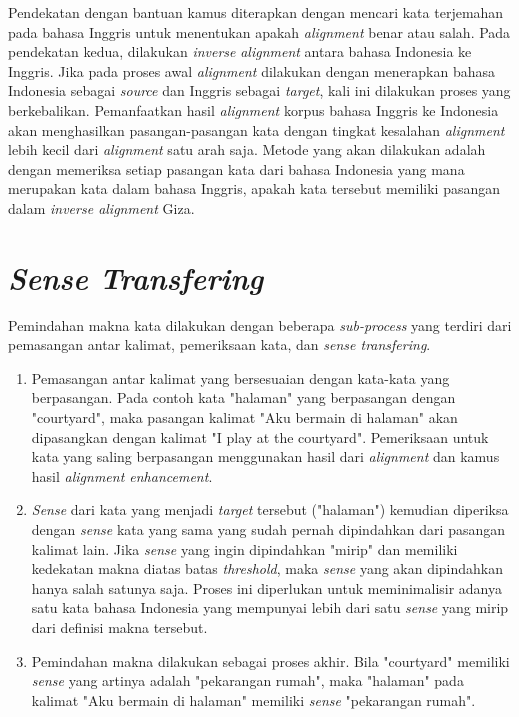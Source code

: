 Pendekatan dengan bantuan kamus diterapkan dengan mencari kata terjemahan pada bahasa Inggris untuk menentukan apakah \textit{alignment} benar atau salah. Pada pendekatan kedua, dilakukan \textit{inverse} \textit{alignment} antara bahasa Indonesia ke Inggris. Jika pada proses awal \textit{alignment} dilakukan dengan menerapkan bahasa Indonesia sebagai \textit{source} dan Inggris sebagai \textit{target}, kali ini dilakukan proses yang berkebalikan. Pemanfaatkan hasil \textit{alignment} korpus bahasa Inggris ke Indonesia akan menghasilkan pasangan-pasangan kata dengan tingkat kesalahan \textit{alignment} lebih kecil dari \textit{alignment} satu arah saja. Metode yang akan dilakukan adalah dengan memeriksa setiap pasangan kata dari bahasa Indonesia yang mana merupakan kata dalam bahasa Inggris, apakah kata tersebut memiliki pasangan dalam \textit{inverse alignment} Giza.

\section{\textit{Sense Transfering}} \label{sec:Sense Transfering}
Pemindahan makna kata dilakukan dengan beberapa \textit{sub-process} yang terdiri dari pemasangan antar kalimat, pemeriksaan kata, dan \textit{sense transfering}.
\begin{enumerate}
	\item Pemasangan antar kalimat yang bersesuaian dengan kata-kata yang berpasangan. Pada contoh kata "halaman" yang berpasangan dengan "courtyard", maka pasangan kalimat "Aku bermain di halaman" akan dipasangkan dengan kalimat "I play at the courtyard". Pemeriksaan untuk kata yang saling berpasangan menggunakan hasil dari \textit{alignment} dan kamus hasil \textit{alignment enhancement}.
	\item \textit{Sense} dari kata yang menjadi \textit{target} tersebut ("halaman") kemudian diperiksa dengan \textit{sense} kata yang sama yang sudah pernah dipindahkan dari pasangan kalimat lain. Jika \textit{sense} yang ingin dipindahkan "mirip" dan memiliki kedekatan makna diatas batas \textit{threshold}, maka \textit{sense} yang akan dipindahkan hanya salah satunya saja. Proses ini diperlukan untuk meminimalisir adanya satu kata bahasa Indonesia yang mempunyai lebih dari satu \textit{sense} yang mirip dari definisi makna tersebut.
	\item Pemindahan makna dilakukan sebagai proses akhir. Bila "courtyard" memiliki \textit{sense} yang artinya adalah "pekarangan rumah", maka "halaman" pada kalimat "Aku bermain di halaman" memiliki \textit{sense} "pekarangan rumah".
\end{enumerate}


